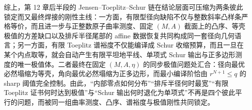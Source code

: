 

综上，第 12 章后半段的 Jensen--Toeplitz--Schur 链在结论层面可压缩为两条彼此锁定而又最终焊接的刚性主线：一方面，有限型径向缺陷不仅与整数斜率凸样条严格等价，而且进一步与正整数原子曲率测度、固定 \((M,A)\) 截面上的凸序、等壳极值的方差缺口以及排斥半径尾部的 affine 数据恢复共同构成同一套径向几何语言；另一方面，有限 Toeplitz 谱裕度不仅能编译成 Schur 收缩预算，而且一旦在某个内点取等，就会自动产生有限平坦地平线、单项式 Schur 输出与正多边形测度的唯一极值体。二者最终在固定 \((M,A,\eta)\) 的同步极值问题处汇合：径向最优必然塌缩为等壳，角向最优必然塌缩为正多边形，而最小编译阶恰由 \(r^{N+1}\le q\) 的 sharp 阈值完全控制。由此，“内部零点如何分布”“排斥半径何时最宽”“有限 Toeplitz 证书何时达到极值”与“Schur 输出何时退化为单项式”不再是四个彼此平行的问题，而被同一组曲率测度、凸序、谱裕度与极值刚性共同锁定。
